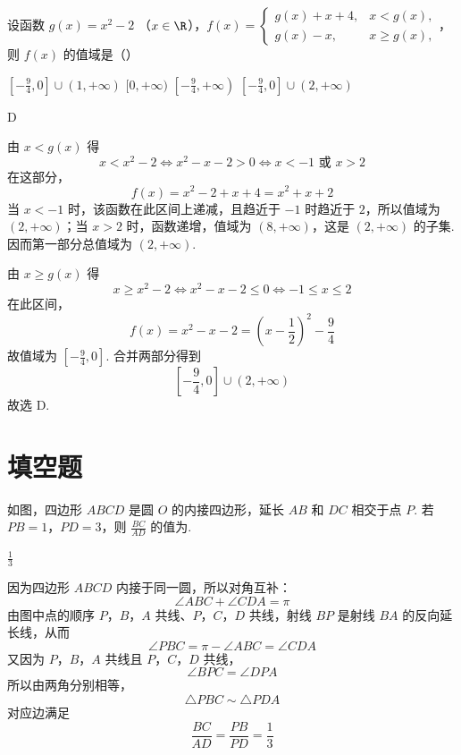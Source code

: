 \begin{problem}
设函数 \(g(x) = x^{2} - 2\) （\(x \in \R\)），\(f(x) = \begin{cases}
g(x) + x + 4, & x < g(x),\\
g(x) - x, & x \geqslant g(x),
\end{cases}\)，
则 \(f(x)\) 的值域是（\quad）

\choices
    {\(\left[-\frac{9}{4}, 0\right] \cup (1, +\infty)\)}
    {\([0, +\infty)\)}
    {\(\left[-\frac{9}{4}, +\infty\right)\)}
    {\(\left[-\frac{9}{4}, 0\right] \cup (2, +\infty)\)}
\end{problem}

\begin{answer}
D
\end{answer}

\begin{solution}
由 \(x<g(x)\) 得
\[
x<x^2-2\iff x^2-x-2>0\iff x<-1\text{ 或 }x>2
\]
在这部分，
\[
f(x)=x^2-2+x+4=x^2+x+2
\]
当 \(x<-1\) 时，该函数在此区间上递减，且趋近于 \(-1\) 时趋近于 \(2\)，所以值域为 \((2,+\infty)\)；当 \(x>2\) 时，函数递增，值域为 \((8,+\infty)\)，这是 \((2,+\infty)\) 的子集. 因而第一部分总值域为 \((2,+\infty)\).

由 \(x\geqslant g(x)\) 得
\[
x\geqslant x^2-2\iff x^2-x-2\leqslant0\iff -1\leqslant x\leqslant2
\]
在此区间，
\[
f(x)=x^2-x-2=\left(x-\frac12\right)^2-\frac94
\]
故值域为 \(\left[-\frac94,0\right]\). 合并两部分得到
\[
\left[-\frac94,0\right]\cup(2,+\infty)
\]
故选 D.
\end{solution}

\section{填空题}

\begin{problem}
如图，四边形 \(ABCD\) 是圆 \(O\) 的内接四边形，延长 \(AB\) 和 \(DC\) 相交于点 \(P\). 若 \(PB = 1\)，\(PD = 3\)，则 \(\frac{BC}{AD}\) 的值为\fillinblank{}.

\end{problem}

\begin{answer}
\(\frac{1}{3}\)
\end{answer}

\begin{solution}
因为四边形 \(ABCD\) 内接于同一圆，所以对角互补：
\[
\angle ABC+\angle CDA=\pi
\]
由图中点的顺序 \(P\)，\(B\)，\(A\) 共线、\(P\)，\(C\)，\(D\) 共线，射线 \(BP\) 是射线 \(BA\)
的反向延长线，从而
\[
\angle PBC=\pi-\angle ABC=\angle CDA
\]
又因为 \(P\)，\(B\)，\(A\) 共线且 \(P\)，\(C\)，\(D\) 共线，
\[
\angle BPC=\angle DPA
\]
所以由两角分别相等，
\[
\triangle PBC\sim\triangle PDA
\]
对应边满足
\[
\frac{BC}{AD}=\frac{PB}{PD}=\frac{1}{3}
\]
\end{solution}

